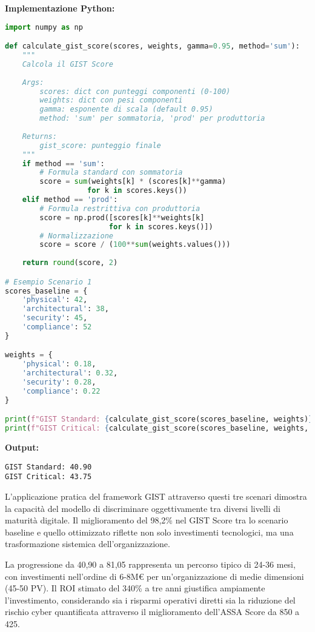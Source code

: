 \begin{tcolorbox}
\vspace{0.3cm}
\textbf{Implementazione Python:}
\begin{lstlisting}[language=Python, basicstyle=\scriptsize\ttfamily]
import numpy as np

def calculate_gist_score(scores, weights, gamma=0.95, method='sum'):
    """
    Calcola il GIST Score
    
    Args:
        scores: dict con punteggi componenti (0-100)
        weights: dict con pesi componenti
        gamma: esponente di scala (default 0.95)
        method: 'sum' per sommatoria, 'prod' per produttoria
    
    Returns:
        gist_score: punteggio finale
    """
    if method == 'sum':
        # Formula standard con sommatoria
        score = sum(weights[k] * (scores[k]**gamma) 
                   for k in scores.keys())
    elif method == 'prod':
        # Formula restrittiva con produttoria
        score = np.prod([scores[k]**weights[k] 
                        for k in scores.keys()])
        # Normalizzazione
        score = score / (100**sum(weights.values()))
    
    return round(score, 2)

# Esempio Scenario 1
scores_baseline = {
    'physical': 42,
    'architectural': 38,
    'security': 45,
    'compliance': 52
}

weights = {
    'physical': 0.18,
    'architectural': 0.32,
    'security': 0.28,
    'compliance': 0.22
}

print(f"GIST Standard: {calculate_gist_score(scores_baseline, weights)}")
print(f"GIST Critical: {calculate_gist_score(scores_baseline, weights, method='prod')}")
\end{lstlisting}

\textbf{Output:}
\begin{verbatim}
GIST Standard: 40.90
GIST Critical: 43.75
\end{verbatim}

\end{tcolorbox}

L'applicazione pratica del framework GIST attraverso questi tre scenari dimostra la capacità del modello di discriminare oggettivamente tra diversi livelli di maturità digitale. Il miglioramento del 98,2\% nel GIST Score tra lo scenario baseline e quello ottimizzato riflette non solo investimenti tecnologici, ma una trasformazione sistemica dell'organizzazione.

La progressione da 40,90 a 81,05 rappresenta un percorso tipico di 24-36 mesi, con investimenti nell'ordine di 6-8M€ per un'organizzazione di medie dimensioni (45-50 PV). Il ROI stimato del 340\% a tre anni giustifica ampiamente l'investimento, considerando sia i risparmi operativi diretti sia la riduzione del rischio cyber quantificata attraverso il miglioramento dell'ASSA Score da 850 a 425.

